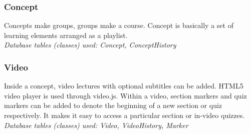 \subsubsection{Concept}
Concepts make groups, groups make a course. Concept is basically a set of learning elements arranged as a playlist.\\
\emph{Database tables (classes) used: Concept, ConceptHistory}

\subsubsection{Video}
Inside a concept, video lectures with optional subtitles can be added. HTML5 video player is used through video.js. Within a video, section markers and quiz markers can be added to denote the beginning of a new section or quiz respectively. It makes it easy to access a particular section or in-video quizzes.\\
\emph{Database tables (classes) used: Video, VideoHistory, Marker}
